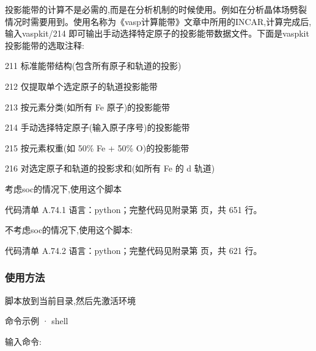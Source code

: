 \documentclass[lang=cn,scheme=chinese,color=blue,device=normal,toc=onecol,math=cm]{elegantbook}
\begin{document}
投影能带的计算不是必需的,而是在分析机制的时候使用。例如在分析晶体场劈裂情况时需要用到。使用名称为《vasp计算能带》文章中所用的INCAR,计算完成后,输入vaspkit/\allowbreak{}214 即可输出手动选择特定原子的投影能带数据文件。下面是vaspkit投影能带的选取注释:\par


211 标准能带结构(包含所有原子和轨道的投影)\par


212 仅提取单个选定原子的轨道投影能带\par


213 按元素分类(如所有 Fe 原子)的投影能带\par


214 手动选择特定原子(输入原子序号)的投影能带\par


215 按元素权重(如 50\% Fe + 50\% O)的投影能带\par


216 对选定原子和轨道的投影求和(如所有 Fe 的 d 轨道)\par


考虑soc的情况下,使用这个脚本\par


\begin{codeindexbox}{代码清单 A.74.1}
语言：python；完整代码见附录第 \pageref{code:74:1} 页，共 651 行。
\end{codeindexbox}


不考虑soc的情况下,使用这个脚本:\par


\begin{codeindexbox}{代码清单 A.74.2}
语言：python；完整代码见附录第 \pageref{code:74:2} 页，共 621 行。
\end{codeindexbox}


\subsubsection{使用方法}


脚本放到当前目录,然后先激活环境\par


\begin{inlinecodebox}{命令示例 · shell}
\end{inlinecodebox}


输入命令:\par
\end{document}

